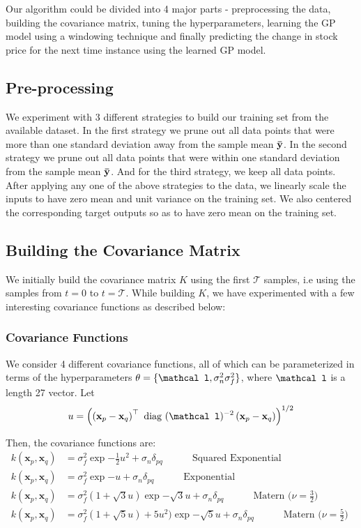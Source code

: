 \documentclass{article} %
\def\bfx{\mathbf x}
\def\bftheta{\mathbf \theta}
\def\bfl{\mathbf \mathcal l}
\def\diag{\mbox{ diag }}
\begin{document}
Our algorithm could be divided into 4 major parts - preprocessing the data, building the covariance matrix, tuning the hyperparameters, learning the GP model using a windowing technique and finally predicting the change in stock price for the next time instance using the learned GP model. 

\subsection{Pre-processing}

We experiment with 3 different strategies to build our training set from the available dataset. In the first strategy we prune out all data points that were more than one standard deviation away from the sample mean $\bf\bar{y}$. In the second strategy we prune out all data points that were within one standard deviation from the sample mean $\bf\bar{y}$. And for the third strategy, we keep all data points. After applying any one of the above strategies to the data, we linearly scale the inputs to have zero mean and unit variance on the training set. We also centered the corresponding target outputs so as to have zero mean on the training set.

\subsection{Building the Covariance Matrix}

We initially build the covariance matrix $K$ using the first $\mathcal{T}$ samples, i.e using the samples from $t = 0$ to $t = \mathcal{T}$. While building $K$, we have experimented with a few interesting covariance functions as described below:  

\subsubsection{Covariance Functions}
We consider 4 different covariance functions, all of which can be parameterized in terms of the hyperparameters $\bftheta = \{\bfl, \sigma_n^2 \sigma_f^2\}$, where $\bfl$ is a length 27 vector.
Let
\begin{equation}
	u = \left( \left( \bfx_p - \bfx_q \right)^\top \diag(\bfl)^{-2} \left( \bfx_p - \bfx_q \right) \right)^{1/2}
\end{equation}

Then, the covariance functions are:
\begin{align}
	k(\bfx_p, \bfx_q) &= \sigma_f^2 \exp{- \frac{1}{2} u^2} + \sigma_n \delta_{pq} \quad \quad \quad \mbox{Squared Exponential}   \\
	k(\bfx_p, \bfx_q) &= \sigma_f^2 \exp{- u} + \sigma_n \delta_{pq} \quad \quad \quad \mbox{Exponential}   \\
	k(\bfx_p, \bfx_q) &= \sigma_f^2 \left( 1 + \sqrt{3} u \right) \exp{- \sqrt{3}  u} + \sigma_n \delta_{pq} \quad \quad \quad \mbox{Matern ($\nu = \frac{3}{2}$) }   \\
	k(\bfx_p, \bfx_q) &= \sigma_f^2 \left( 1 + \sqrt{5} u \right) + 5 u^2) \exp{- \sqrt{5} u} + \sigma_n \delta_{pq} \quad \quad \quad \mbox{Matern ($\nu = \frac{5}{2}$) }
\end{align}
\end{document}
